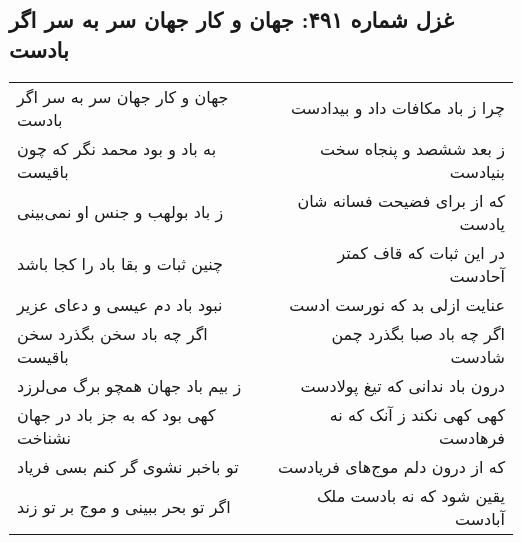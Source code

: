 \begin{center}
\section*{غزل شماره ۴۹۱: جهان و کار جهان سر به سر اگر بادست}
\label{sec:0491}
\begin{longtable}{l p{0.5cm} r}
جهان و کار جهان سر به سر اگر بادست
&&
چرا ز باد مکافات داد و بیدادست
\\
به باد و بود محمد نگر که چون باقیست
&&
ز بعد ششصد و پنجاه سخت بنیادست
\\
ز باد بولهب و جنس او نمی‌بینی
&&
که از برای فضیحت فسانه شان یادست
\\
چنین ثبات و بقا باد را کجا باشد
&&
در این ثبات که قاف کمتر آحادست
\\
نبود باد دم عیسی و دعای عزیر
&&
عنایت ازلی بد که نورست ادست
\\
اگر چه باد سخن بگذرد سخن باقیست
&&
اگر چه باد صبا بگذرد چمن شادست
\\
ز بیم باد جهان همچو برگ می‌لرزد
&&
درون باد ندانی که تیغ پولادست
\\
کهی بود که به جز باد در جهان نشناخت
&&
کهی کهی نکند ز آنک که نه فرهادست
\\
تو باخبر نشوی گر کنم بسی فریاد
&&
که از درون دلم موج‌های فریادست
\\
اگر تو بحر ببینی و موج بر تو زند
&&
یقین شود که نه بادست ملک آبادست
\\
\end{longtable}
\end{center}
